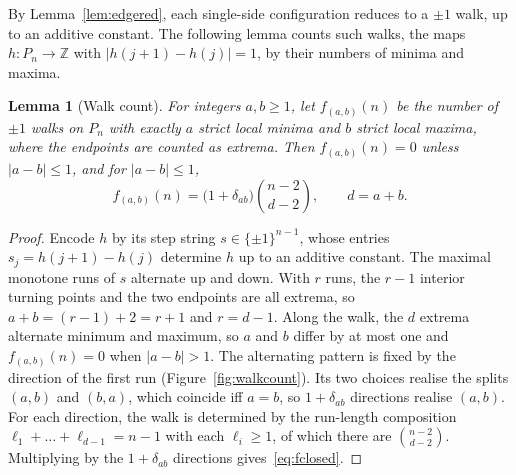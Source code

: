 \documentclass[11pt]{article}
\newtheorem{lemma}[theorem]{Lemma}
\theoremstyle{definition}
\theoremstyle{remark}
\newcommand{\Z}{\mathbb{Z}}
\begin{document}
By Lemma~\ref{lem:edgered}, each single-side configuration reduces to a $\pm1$
walk, up to an additive constant. The following lemma counts such
walks, the maps $h\colon P_n\to\Z$ with $|h(j+1)-h(j)|=1$, by their numbers of
minima and maxima.

\begin{lemma}[Walk count]\label{lem:binom}
For integers $a,b\ge1$, let $f_{(a,b)}(n)$ be the number of $\pm1$ walks on $P_n$
with exactly $a$ strict local minima and $b$ strict local maxima, where the
endpoints are counted as extrema. Then $f_{(a,b)}(n)=0$ unless $|a-b|\le1$, and
for $|a-b|\le1$,
\begin{equation}\label{eq:fclosed}
  f_{(a,b)}(n)=\big(1+\delta_{ab}\big)\binom{n-2}{d-2},\qquad d=a+b.
\end{equation}
\end{lemma}

\begin{proof}
Encode $h$ by its step string $s\in\{\pm1\}^{n-1}$, whose entries
$s_j=h(j+1)-h(j)$ determine $h$ up to an additive constant. The
maximal monotone runs of $s$ alternate up and down. With $r$ runs, the $r-1$
interior turning points and the two endpoints are all extrema, so $a+b=(r-1)+2=r+1$
and $r=d-1$. Along the walk, the $d$ extrema alternate minimum and maximum, so
$a$ and $b$ differ by at most one and $f_{(a,b)}(n)=0$ when $|a-b|>1$. The
alternating pattern is fixed by the direction of the first run
(Figure~\ref{fig:walkcount}). Its two choices realise the splits $(a,b)$ and
$(b,a)$, which coincide iff $a=b$, so $1+\delta_{ab}$ directions realise $(a,b)$.
For each direction, the walk is determined by the run-length composition
$\ell_1+\dots+\ell_{d-1}=n-1$ with each $\ell_i\ge1$, of which there are
$\binom{n-2}{d-2}$. Multiplying by the $1+\delta_{ab}$ directions gives~\eqref{eq:fclosed}.
\end{proof}
\end{document}
